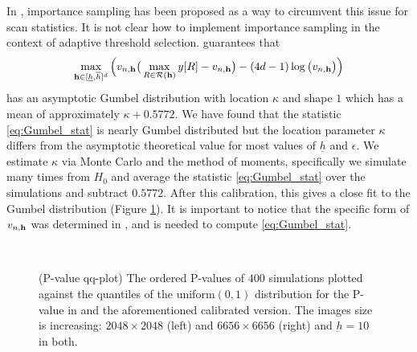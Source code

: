 \documentclass[twoside,11pt]{article}
\newcommand{\eac}[1]{\textcolor{blue}{(#1)}}
\begin{document}
In \citep{amuarioarei2015approximation}, importance sampling has been proposed as a way to circumvent this issue for scan statistics.
It is not clear how to implement importance sampling in the context of adaptive threshold selection.
 guarantees that 
\begin{equation}
\label{eq:Gumbel_stat}
 \max_{\mathbf{h} \in [\underline h, \overline h]^d} \Big( v_{n,\mathbf{h}} \big( \max_{R \in \mathcal{R}(\mathbf{h})} y[R] - v_{n,\mathbf{h}} \big) - (4d - 1) \log \big( v_{n,\mathbf{h}} \big) \Big) 
\end{equation}
has an asymptotic Gumbel distribution with location $\kappa$ and shape $1$ which has a mean of approximately $\kappa + 0.5772$.
We have found that the statistic \eqref{eq:Gumbel_stat} is nearly Gumbel distributed but the location parameter $\kappa$ differs from the asymptotic theoretical value for most values of $\underline h$ and $\epsilon$. 
We estimate $\kappa$ via Monte Carlo and the method of moments, specifically we simulate many times from $H_0$ and average the statistic \eqref{eq:Gumbel_stat} over the simulations and subtract $0.5772$.
After this calibration, this gives a close fit to the Gumbel distribution (Figure \ref{fig2}). 
It is important to notice that the specific form of $v_{n,\mathbf{h}}$ was determined in , and is needed to compute \eqref{eq:Gumbel_stat}.

\begin{figure}[!htbp]
\centering
\mbox{
}
\caption{{\small (P-value qq-plot) The ordered P-values of $400$ simulations plotted against the quantiles of the uniform$(0,1)$ distribution for the P-value in  and the aforementioned calibrated version.  The images size is increasing: $2048 \times 2048$ (left) and $6656 \times 6656$ (right) and $\underbar h = 10$ in both.}
}
\label{fig2}
\end{figure}
\end{document}
